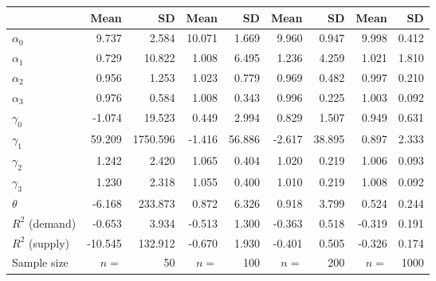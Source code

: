 
\begin{tabular}[t]{lrrrrrrrr}
\toprule
  & Mean & SD & Mean  & SD  & Mean   & SD   & Mean    & SD   \\
\midrule
$\alpha_{0}$ & 9.737 & 2.584 & 10.071 & 1.669 & 9.960 & 0.947 & 9.998 & 0.412\\
$\alpha_{1}$ & 0.729 & 10.822 & 1.008 & 6.495 & 1.236 & 4.259 & 1.021 & 1.810\\
$\alpha_{2}$ & 0.956 & 1.253 & 1.023 & 0.779 & 0.969 & 0.482 & 0.997 & 0.210\\
$\alpha_{3}$ & 0.976 & 0.584 & 1.008 & 0.343 & 0.996 & 0.225 & 1.003 & 0.092\\
$\gamma_{0}$ & -1.074 & 19.523 & 0.449 & 2.994 & 0.829 & 1.507 & 0.949 & 0.631\\
$\gamma_{1}$ & 59.209 & 1750.596 & -1.416 & 56.886 & -2.617 & 38.895 & 0.897 & 2.333\\
$\gamma_{2}$ & 1.242 & 2.420 & 1.065 & 0.404 & 1.020 & 0.219 & 1.006 & 0.093\\
$\gamma_{3}$ & 1.230 & 2.318 & 1.055 & 0.400 & 1.010 & 0.219 & 1.008 & 0.092\\
$\theta$ & -6.168 & 233.873 & 0.872 & 6.326 & 0.918 & 3.799 & 0.524 & 0.244\\
$R^{2}$ (demand) & -0.653 & 3.934 & -0.513 & 1.300 & -0.363 & 0.518 & -0.319 & 0.191\\
$R^{2}$ (supply) & -10.545 & 132.912 & -0.670 & 1.930 & -0.401 & 0.505 & -0.326 & 0.174\\
Sample size & $n =$ & 50 & $n =$ & 100 & $n =$ & 200 & $n =$ & 1000\\
\bottomrule
\end{tabular}
